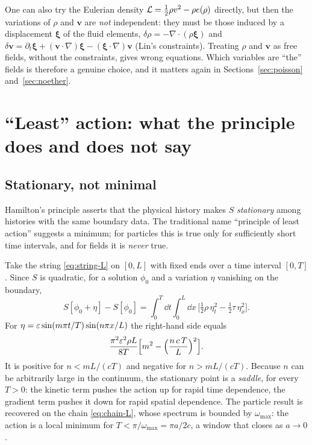 One can also try the Eulerian density $\mathcal{L}=\tfrac12\rho v^2-\rho e(\rho)$ directly,
but then the variations of $\rho$ and $\mathbf{v}$ are \emph{not} independent: they
must be those induced by a displacement $\boldsymbol\xi$ of the fluid elements,
$\delta\rho=-\nabla\!\cdot(\rho\boldsymbol\xi)$ and
$\delta\mathbf{v}=\partial_t\boldsymbol\xi+(\mathbf{v}\!\cdot\!\nabla)\boldsymbol\xi
-(\boldsymbol\xi\!\cdot\!\nabla)\mathbf{v}$ (Lin's constraints). Treating
$\rho$ and $\mathbf{v}$ as free fields, without the constraints, gives wrong
equations. Which variables are ``the'' fields is therefore a genuine choice, and
it matters again in Sections~\ref{sec:poisson} and~\ref{sec:noether}.

\section{``Least'' action: what the principle does and does not say}
\label{sec:action}

\subsection{Stationary, not minimal}

Hamilton's principle asserts that the physical history makes $S$ \emph{stationary}
among histories with the same boundary data. The traditional name ``principle
of least action'' suggests a minimum; for particles this is true only for
sufficiently short time intervals, and for fields it is \emph{never} true.

Take the string \eqref{eq:string-L} on $[0,L]$ with fixed ends over a time
interval $[0,T]$. Since $S$ is quadratic, for a solution $\phi_0$ and
a variation $\eta$ vanishing on the boundary,
\[
  S[\phi_0+\eta]-S[\phi_0]=\int_0^T\!\!\dd t\int_0^L\!\!\dd x\,\Big[\tfrac12\rho\,\eta_t^2-\tfrac12\tau\,\eta_x^2\Big].
\]
For $\eta=\varepsilon\sin(m\pi t/T)\sin(n\pi x/L)$ the right-hand side equals
\begin{equation}
  \frac{\pi^2\varepsilon^2\rho L}{8T}\Big[m^2-\Big(\frac{n\,c\,T}{L}\Big)^2\Big].
  \label{eq:second-var}
\end{equation}
It is positive for $n<mL/(cT)$ and negative for $n>mL/(cT)$. Because $n$ can be
arbitrarily large in the continuum, the stationary point is a \emph{saddle},
for every $T>0$: the kinetic term pushes the action up for rapid time
dependence, the gradient term pushes it down for rapid spatial dependence. The
particle result is recovered on the chain \eqref{eq:chain-L}, whose spectrum is
bounded by $\omega_{\max}$: the action is a local minimum for
$T<\pi/\omega_{\max}=\pi a/2c$, a window that closes as $a\to0$.

